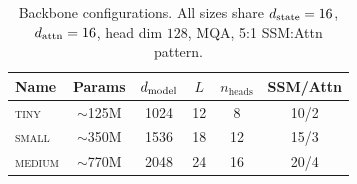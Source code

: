 \begin{table}[h]
\centering
\caption{Backbone configurations. All sizes share $d_{\text{state}} = 16$, $d_{\text{attn}} = 16$, head dim $128$, MQA, 5:1 SSM:Attn pattern.}
\label{tab:configs}
\small
\begin{tabular}{lccccc}
\toprule
Name & Params & $d_{\text{model}}$ & $L$ & $n_{\text{heads}}$ & SSM/Attn \\
\midrule
\textsc{tiny}   & $\sim$125M & 1024 & 12 & 8  & 10/2 \\
\textsc{small}  & $\sim$350M & 1536 & 18 & 12 & 15/3 \\
\textsc{medium} & $\sim$770M & 2048 & 24 & 16 & 20/4 \\
\bottomrule
\end{tabular}
\end{table}
